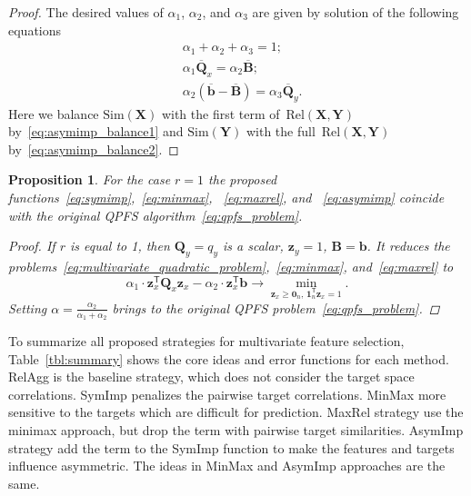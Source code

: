 \documentclass[12pt,oneside]{article}
\newtheorem{proposition}{Proposition}
\theoremstyle{definition}
\newcommand{\bz}{\mathbf{z}}
\newcommand{\bb}{\mathbf{b}}
\newcommand{\bY}{\mathbf{Y}}
\newcommand{\bX}{\mathbf{X}}
\newcommand{\bB}{\mathbf{B}}
\newcommand{\bQ}{\mathbf{Q}}
\newcommand{\T}{\mathsf{T}}
\newcommand{\bOne}{\boldsymbol{1}}
\newcommand{\bZero}{\boldsymbol{0}}
\begin{document}
\begin{proof}
	The desired values of $\alpha_1$, $\alpha_2$, and $\alpha_3$ are given by solution of the following equations
	\begin{align}
	&\alpha_1 + \alpha_2 + \alpha_3 = 1; \\
	&\alpha_1 \overline{\bQ}_x = \alpha_2 \overline{\bB}; \label{eq:asymimp_balance1}\\
	&\alpha_2 \left(\overline{\bb} - \overline{\bB} \right) = \alpha_3 \overline{\bQ}_y.
	\label{eq:asymimp_balance2}
	\end{align}
	Here we balance $\text{Sim}(\bX)$ with the first term of~$\text{Rel}(\bX, \bY)$ by~\eqref{eq:asymimp_balance1} and $\text{Sim}(\bY)$ with the full~$\text{Rel}(\bX, \bY)$ by~\eqref{eq:asymimp_balance2}.
\end{proof}
\begin{proposition}
	For the case $r=1$ the proposed functions~\eqref{eq:symimp},~\eqref{eq:minmax}, ~\eqref{eq:maxrel}, and ~\eqref{eq:asymimp} coincide with the original QPFS algorithm~\eqref{eq:qpfs_problem}.

	\begin{proof}
		If $r$ is equal to 1, then $\bQ_y = q_y$ is a scalar, $\bz_y = 1$, $\bB = \bb$. It reduces the problems~\eqref{eq:multivariate_quadratic_problem},~\eqref{eq:minmax}, and~\eqref{eq:maxrel} to
		\begin{equation}
		\alpha_1 \cdot \bz_x^{\T} \bQ_x \bz_x - \alpha_2 \cdot \bz_x^{\T} \bb \rightarrow \min_{\bz_x \geq \bZero_n, \, \bOne_n^{\T}\bz_x=1} .
		\end{equation}
		Setting $\alpha = \frac{\alpha_2}{\alpha_1 + \alpha_2}$ brings to the original QPFS problem~\eqref{eq:qpfs_problem}.
	\end{proof}
\end{proposition}

To summarize all proposed strategies for multivariate feature selection, Table~\ref{tbl:summary} shows the core ideas and error functions for each method. 
RelAgg is the baseline strategy, which does not consider the target space correlations.
SymImp penalizes the pairwise target correlations.
MinMax more sensitive to the targets which are difficult for prediction.
MaxRel strategy use the minimax approach, but drop the term with pairwise target similarities.
AsymImp strategy add the term to the SymImp function to make the features and targets influence asymmetric. 
The ideas in MinMax and AsymImp approaches are the same. 
\end{document}
